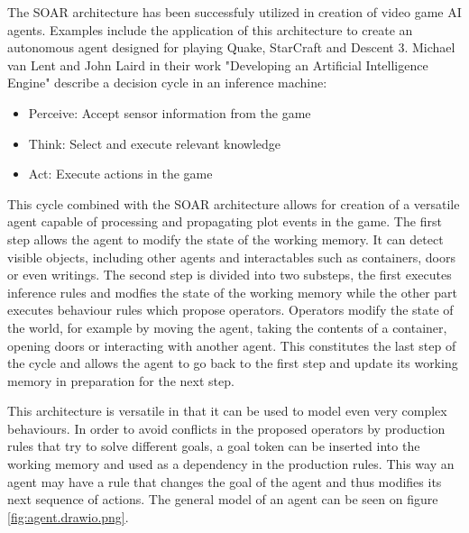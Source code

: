 The SOAR architecture has been successfuly utilized in creation of video game AI agents.
Examples include the application of this architecture to create an autonomous agent designed for playing Quake\cite{laird2001knows}, StarCraft\cite{turner2013soar-sc} and Descent 3\cite{van1999developing}.
Michael van Lent and John Laird in their work "Developing an Artificial Intelligence Engine"\cite{van1999developing} describe a decision cycle in an inference machine:

\begin{itemize}
    \item Perceive: Accept sensor information from the game
    \item Think: Select and execute relevant knowledge
    \item Act: Execute actions in the game
\end{itemize}

This cycle combined with the SOAR architecture allows for creation of a versatile agent capable of processing and propagating plot events in the game.
The first step allows the agent to modify the state of the working memory.
It can detect visible objects, including other agents and interactables such as containers, doors or even writings.
The second step is divided into two substeps, the first executes inference rules and modfies the state of the working memory while the other part executes behaviour rules which propose operators.
Operators modify the state of the world, for example by moving the agent, taking the contents of a container, opening doors or interacting with another agent.
This constitutes the last step of the cycle and allows the agent to go back to the first step and update its working memory in preparation for the next step.

This architecture is versatile in that it can be used to model even very complex behaviours.
In order to avoid conflicts in the proposed operators by production rules that try to solve different goals, a goal token can be inserted into the working memory and used as a dependency in the production rules.
This way an agent may have a rule that changes the goal of the agent and thus modifies its next sequence of actions.
The general model of an agent can be seen on figure \ref{fig:agent.drawio.png}.

